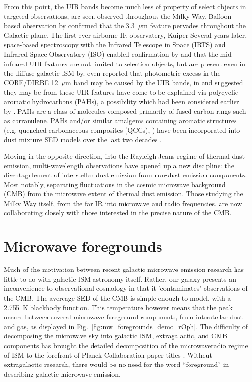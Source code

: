     From this point, the UIR bands become much less of property of select objects in targeted observations, are seen observed throughout the Milky Way. Balloon-based observation by \cite{giard94} confirmed that the 3.3~$\mu$m feature pervades throughout the Galactic plane. The first-ever airborne IR observatory, Kuiper Several years later, space-based spectroscopy with the Infrared Telescope in Space (IRTS)\citep{murakami96} and Infrared Space Observatory (ISO)\citep{kessler96} enabled confirmation by \cite{onaka96} and \cite{mattila96} that the mid-infrared UIR features are not limited to selection objects, but are present even in the diffuse galactic ISM by. \cite{dwek97} even reported that photometric excess in the COBE/DIRBE 12~$\mu$m band may be caused by the UIR bands, in and suggested they may be from these UIR features have come to be explained via polycyclic aromatic hydrocarbons (PAHs), a possibility which had been considered earlier by \cite{allamandola85,puget85}. PAHs are a class of molecules composed primarily of fused carbon rings such as corranulene. PAHs and/or similar amalgems containing aromatic structures (e.g. quenched carbonaceous composites (QCCs), \cite{sakata84}) have been incorporated into dust mixture SED models over the last two decades \citep{drli01, drli07, hony01, dustem11, galliano11, jones13, jones17}.

    Moving in the opposite direction, into the Rayleigh-Jeans regime of thermal dust emission, multi-wavelength observations have opened up a new discipline: the disentagnlement of interstellar dust emission from non-dust emission components. Most notably, separating fluctuations in the cosmic microwave background (CMB) from the microwave extent of thermal dust emission. Those studying the Milky Way itself, from the far IR into microwave and radio frequencies, are now collaborating closely with those interested in the precise nature of the CMB.

\section{Microwave foregrounds}
    Much of the motivation between recent galactic microwave emission research has little to do with galactic ISM astronomy itself. Rather, our galaxy presents an inconvenience to observational cosmology in that it 'contaminates' observations of the CMB. The avereage SED of the CMB is simple enough to model, with a 2.755~K blackbody function. This temperature however means that the peak occurs between several microwave foreground components, from interstellar dust and gas, as displayed in Fig.~\ref{fig:mw_foregrounds_demo_rOph}. The difficulty of decomposing the microwave sky into galactic ISM, extragalactic, and CMB components has brought the detailed decomposition of the microwave\-radio regime of ISM to the forefront of Planck Collaboration paper titles \citep{planckEarly11I,planck2013I,planck2015I}. Without extragalactic research, there would be no need for the word ``foreground'' in describing galactic microwave emission.

